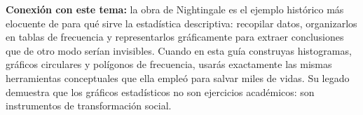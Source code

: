 \documentclass[11pt, letterpaper]{article}
\begin{document}
\begin{tcolorbox}
\begin{minipage}[t]{0.78\linewidth}
\medskip
\textbf{Conexi\'on con este tema:} la obra de Nightingale es el ejemplo hist\'orico m\'as elocuente de para qu\'e sirve la estad\'istica descriptiva: recopilar datos, organizarlos en tablas de frecuencia y representarlos gr\'aficamente para extraer conclusiones que de otro modo ser\'ian invisibles. Cuando en esta gu\'ia construyas histogramas, gr\'aficos circulares y pol\'igonos de frecuencia, usar\'as exactamente las mismas herramientas conceptuales que ella emple\'o para salvar miles de vidas. Su legado demuestra que los gr\'aficos estad\'isticos no son ejercicios acad\'emicos: son instrumentos de transformaci\'on social.
\end{minipage}

\end{tcolorbox}

\vspace{0.65cm}

\end{document}
